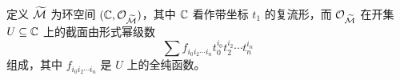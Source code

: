 \begin{definition}
定义 $\widetilde{\mathcal{M}}$ 为环空间 $(\mathbb{C},\mathcal{O}_{\widetilde{\mathcal{M}}})$，其中 $\mathbb{C}$ 看作带坐标 $t_1$ 的复流形，而 $\mathcal{O}_{\widetilde{\mathcal{M}}}$ 在开集 $U\subseteq\mathbb{C}$ 上的截面由形式幂级数
\[
\sum f_{i_0i_2\cdots i_n}t_0^{i_0}t_2^{i_2}\cdots t_n^{i_n}
\]
组成，其中 $f_{i_0i_2\cdots i_n}$ 是 $U$ 上的全纯函数。
\end{definition}

